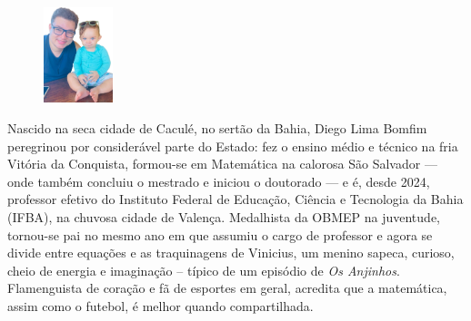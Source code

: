 \documentclass{hipatia}
\begin{document}
\begin{figure}
\vspace{-10pt}
  \includegraphics[width=2cm]{diego.png}
\end{figure}\noindent
Nascido na seca cidade de Caculé, no sertão da Bahia, Diego Lima Bomfim peregrinou por considerável parte do Estado: fez o ensino médio e técnico na fria Vitória da Conquista, formou-se em Matemática na calorosa São Salvador --- onde também concluiu o mestrado e iniciou o doutorado --- e é, desde 2024, professor efetivo do Instituto Federal de Educação, Ciência e Tecnologia da Bahia (IFBA), na chuvosa cidade de Valença. Medalhista da OBMEP na juventude, tornou-se pai no mesmo ano em que assumiu o cargo de professor e agora se divide entre equações e as traquinagens de Vinicius, um menino sapeca, curioso, cheio de energia e imaginação -- típico de um episódio de {\it Os Anjinhos}. Flamenguista de coração e fã de esportes em geral, acredita que a matemática, assim como o futebol, é melhor quando compartilhada.
\end{document}
